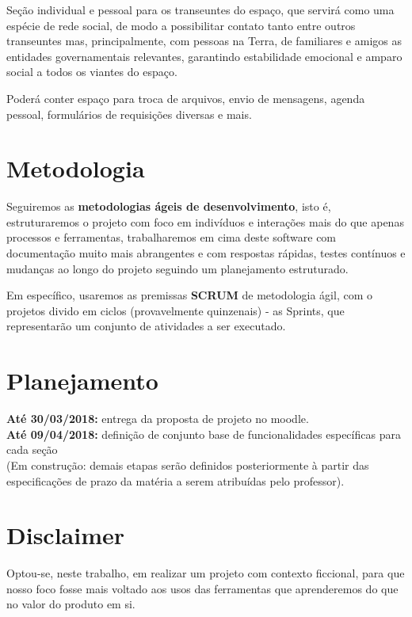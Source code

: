 \documentclass[12pt]{exam}
\begin{document}
    Seção individual e pessoal para os transeuntes do espaço, que servirá como uma espécie de rede social, de modo a possibilitar contato tanto entre outros transeuntes mas, principalmente, com pessoas na Terra, de familiares e amigos as entidades governamentais relevantes, garantindo estabilidade emocional e amparo social a todos os viantes do espaço. 
    
    Poderá conter espaço para troca de arquivos, envio de mensagens, agenda pessoal, formulários de requisições diversas e mais.  \\
    
    
\section{Metodologia}

	Seguiremos as \textbf{metodologias ágeis de desenvolvimento}, isto é, estruturaremos o projeto com foco em indivíduos e interações mais do que apenas processos e ferramentas, trabalharemos em cima deste software com documentação muito mais abrangentes e com respostas rápidas, testes contínuos e mudanças ao longo do projeto seguindo um planejamento estruturado.
	
    Em específico, usaremos as premissas \textbf{SCRUM} de metodologia ágil, com o projetos divido em ciclos (provavelmente quinzenais) - as Sprints, que representarão um conjunto de atividades a ser executado. 
    
\section{Planejamento}
	\textbf{Até 30/03/2018:} entrega da proposta de projeto no moodle. \\    
    \textbf{Até 09/04/2018:} definição de conjunto base de funcionalidades específicas para cada seção \\
    
   	(Em construção: demais etapas serão definidos posteriormente à partir das especificações de prazo da matéria a serem atribuídas pelo professor). \\
    
\section{Disclaimer}
	
	Optou-se, neste trabalho, em realizar um projeto com contexto ficcional, para que nosso foco fosse mais voltado aos usos das ferramentas que  aprenderemos do que no valor do produto em si. 
    

	 
	
	
	
\end{document}
